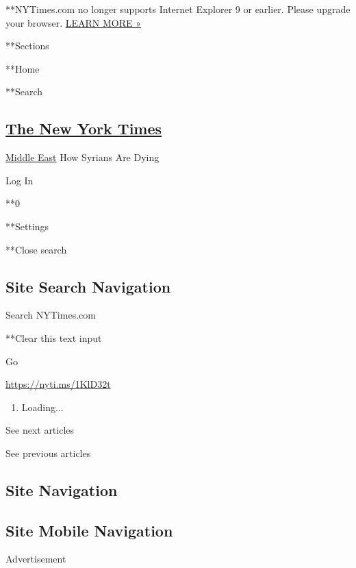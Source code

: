  **NYTimes.com no longer supports Internet Explorer 9 or earlier. Please
upgrade your browser.
\href{http://www.nytimes3xbfgragh.onion/content/help/site/ie9-support.html}{LEARN
MORE »}

**Sections

**Home

**Search

\hypertarget{the-new-york-times}{%
\subsection{\texorpdfstring{\href{http://www.nytimes3xbfgragh.onion/}{The
New York Times}}{The New York Times}}\label{the-new-york-times}}

 \href{/section/world/middleeast}{Middle East} \textbar{}How Syrians Are
Dying

Log In

**0

**Settings

**Close search

\hypertarget{site-search-navigation}{%
\subsection{Site Search Navigation}\label{site-search-navigation}}

Search NYTimes.com

**Clear this text input

Go

\url{https://nyti.ms/1KlD32t}

\begin{enumerate}
\def\labelenumi{\arabic{enumi}.}
\item
  Loading...
\end{enumerate}

See next articles

See previous articles

\hypertarget{site-navigation}{%
\subsection{Site Navigation}\label{site-navigation}}

\hypertarget{site-mobile-navigation}{%
\subsection{Site Mobile Navigation}\label{site-mobile-navigation}}

Advertisement

